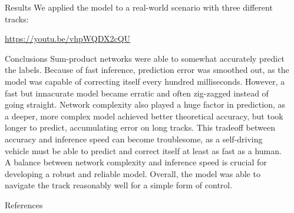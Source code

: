 \documentclass[final,hyperref={pdfpagelabels=false},notheorems]{beamer}
\theoremstyle{thesisstyle}
\begin{document}
\begin{frame}[t]
\begin{columns}[t]
\begin{column}{.5\textwidth}
\begin{block}{Results}
      We applied the model to a real-world scenario with three different tracks:\\
      \begin{center}
        \url{https://youtu.be/vhpWQDX2cQU}
      \end{center}
    \end{block}

    \begin{block}{Conclusions}
      Sum-product networks were able to somewhat accurately predict the labels. Because of fast
      inference, prediction error was smoothed out, as the model was capable of correcting itself
      every hundred milliseconds. However, a fast but innacurate model became erratic and often
      zig-zagged instead of going straight. Network complexity also played a huge factor in
      prediction, as a deeper, more complex model achieved better theoretical accuracy, but took
      longer to predict, accumulating error on long tracks.  This tradeoff between accuracy and
      inference speed can become troublesome, as a self-driving vehicle must be able to predict and
      correct itself at least as fast as a human. A balance between network complexity and
      inference speed is crucial for developing a robust and reliable model.  Overall, the model
      was able to navigate the track reasonably well for a simple form of control.
    \end{block}

    \begin{block}{References}
      \linespread{0.928}\selectfont
      \printbibliography[heading=none]
    \end{block}

  \end{column}

  \begin{column}{.015\textwidth}\end{column} %

\end{columns} %

\end{frame} %
\end{document}

